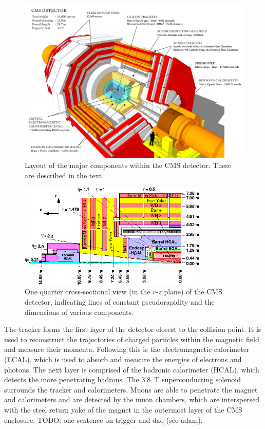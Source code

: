 \begin{figure}
\centering
\includegraphics[width=1\textwidth]{figs/detector/cms3d}
\caption{Layout of the major components within the CMS detector. These are 
described in the text.}
\label{fig:cms3d}
\end{figure}
\begin{figure}
\centering
\includegraphics[width=0.8\textwidth]{figs/detector/cms2d.png}
\caption{One quarter cross-sectional view (in the $r$-$z$ plane) of the CMS 
detector, indicating lines of constant pseudorapidity and the dimensions of 
various components.}
\label{fig:cms2d}
\end{figure}

The tracker forms the first layer of the detector closest to the collision 
point. It is used to reconstruct the trajectories of charged particles within 
the magnetic field and measure their momenta. Following this is the 
electromagnetic calorimeter (ECAL), which is used to absorb and measure the 
energies of electrons and photons. The next layer is comprised of the hadronic 
calorimeter (HCAL), which detects the more penetrating hadrons. The 3.8~T 
superconducting solenoid surrounds the tracker and calorimeters. Muons are able 
to penetrate the magnet and calorimeters and are detected by the muon chambers, 
which are interspersed with the steel return yoke of the magnet in the 
outermost layer of the CMS enclosure.
TODO: one sentence on trigger and daq (see adam).

